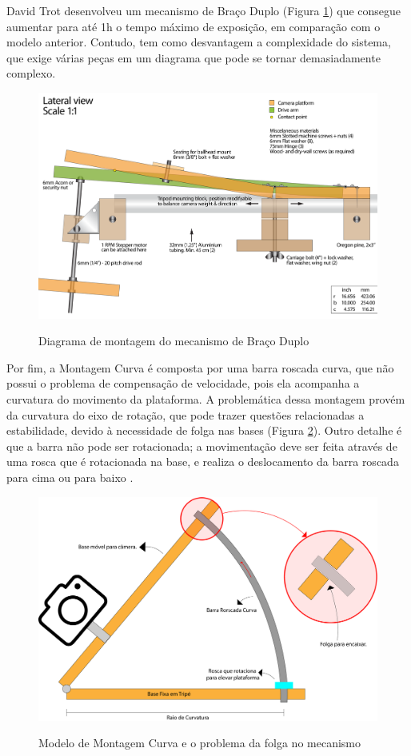 David Trot desenvolveu um mecanismo de Braço Duplo (Figura \ref{fig:doublearm}) que consegue aumentar para até 1h o tempo máximo de exposição, em comparação com o modelo anterior. Contudo, tem como desvantagem a complexidade do sistema, que exige várias peças em um diagrama que pode se tornar demasiadamente complexo.

\begin{figure}[!htb]
	\centering
	\caption{Diagrama de montagem do mecanismo de Braço Duplo}
	\includegraphics[width=0.6\linewidth]{figuras/heavy-duty-double-arm-barndoor-building-plans-3}
	\label{fig:doublearm}
\end{figure}

Por fim, a Montagem Curva é composta por uma barra roscada curva, que não possui o problema de compensação de velocidade, pois ela acompanha a curvatura do movimento da plataforma. A problemática dessa montagem provém da curvatura do eixo de rotação, que pode trazer questões relacionadas a estabilidade, devido à necessidade de folga nas bases (Figura \ref{fig:montagemCurva}). Outro detalhe é que a barra não pode ser rotacionada; a movimentação deve ser feita através de uma rosca que é rotacionada na base, e realiza o deslocamento da barra roscada para cima ou para baixo \cite{site:pentaxBarnDoor}.  

 
 \begin{figure}[!htb]
 	\centering
 	\caption[Modelo de Montagem Curva]{Modelo de Montagem Curva e o problema da folga no mecanismo}
 	\includegraphics[width=0.6\linewidth]{figuras/montagemCurva}
 	\label{fig:montagemCurva}
 \end{figure}

